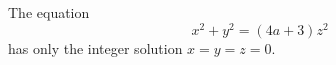 \begin{proposition}
    The equation
\[
    x^2+y^2=(4a+3)z^2
\]
    has only the integer solution $x=y=z=0$.
\end{proposition}
